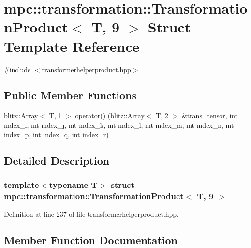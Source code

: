 \hypertarget{structmpc_1_1transformation_1_1_transformation_product_3_01_t_00_019_01_4}{}\section{mpc\+:\+:transformation\+:\+:Transformation\+Product$<$ T, 9 $>$ Struct Template Reference}
\label{structmpc_1_1transformation_1_1_transformation_product_3_01_t_00_019_01_4}


{\ttfamily \#include $<$transformerhelperproduct.\+hpp$>$}

\subsection*{Public Member Functions}
\begin{DoxyCompactItemize}
\item 
blitz\+::\+Array$<$ T, 1 $>$ \mbox{\hyperlink{structmpc_1_1transformation_1_1_transformation_product_3_01_t_00_019_01_4_af520a1b15743d0fce9aa0a2a1c91aed4}{operator()}} (blitz\+::\+Array$<$ T, 2 $>$ \&trans\+\_\+tensor, int index\+\_\+i, int index\+\_\+j, int index\+\_\+k, int index\+\_\+l, int index\+\_\+m, int index\+\_\+n, int index\+\_\+p, int index\+\_\+q, int index\+\_\+r)
\end{DoxyCompactItemize}


\subsection{Detailed Description}
\subsubsection*{template$<$typename T$>$\newline
struct mpc\+::transformation\+::\+Transformation\+Product$<$ T, 9 $>$}



Definition at line 237 of file transformerhelperproduct.\+hpp.



\subsection{Member Function Documentation}
\mbox{\label{structmpc_1_1transformation_1_1_transformation_product_3_01_t_00_019_01_4_af520a1b15743d0fce9aa0a2a1c91aed4}} 
